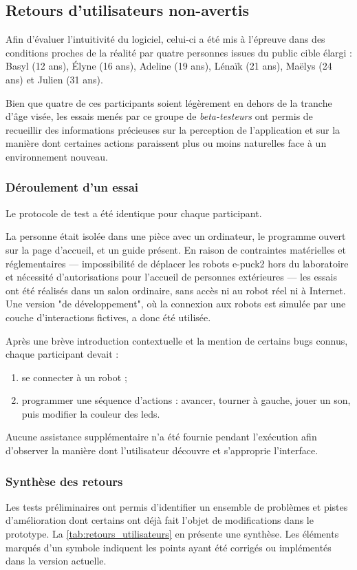 \subsection{Retours d'utilisateurs non-avertis}
Afin d'évaluer l'intuitivité du logiciel, celui-ci a été mis à l'épreuve dans des conditions proches de la réalité par quatre personnes issues du public cible élargi : Basyl (12 ans), Élyne (16 ans), Adeline (19 ans), Lénaïk (21 ans), Maëlys (24 ans) et Julien (31 ans).

Bien que quatre de ces participants soient légèrement en dehors de la tranche d'âge visée, les essais menés par ce groupe de \textit{beta-testeurs} ont permis de recueillir des informations précieuses sur la perception de l'application et sur la manière dont certaines actions paraissent plus ou moins naturelles face à un environnement nouveau.

\subsubsection{Déroulement d'un essai}
Le protocole de test a été identique pour chaque participant.

La personne était isolée dans une pièce avec un ordinateur, le programme ouvert sur la page d'accueil, et un guide présent.  
En raison de contraintes matérielles et réglementaires — impossibilité de déplacer les robots e-puck2 hors du laboratoire et nécessité d'autorisations pour l'accueil de personnes extérieures — les essais ont été réalisés dans un salon ordinaire, sans accès ni au robot réel ni à Internet.  
Une version "de développement", où la connexion aux robots est simulée par une couche d'interactions fictives, a donc été utilisée.

Après une brève introduction contextuelle et la mention de certains bugs connus, chaque participant devait :
\begin{enumerate}
    \item se connecter à un robot ;
    \item programmer une séquence d'actions : avancer, tourner à gauche, jouer un son, puis modifier la couleur des \acrshort{led}s.
\end{enumerate}

Aucune assistance supplémentaire n'a été fournie pendant l'exécution afin d'observer la manière dont l'utilisateur découvre et s'approprie l'interface.

\subsubsection{Synthèse des retours}
Les tests préliminaires ont permis d’identifier un ensemble de problèmes et pistes d’amélioration dont certains ont déjà fait l'objet de modifications dans le prototype.  
La \autoref{tab:retours_utilisateurs} en présente une synthèse.  
Les éléments marqués d'un symbole \textcolor{green}{\faCheckSquare} indiquent les points ayant été corrigés ou implémentés dans la version actuelle.

